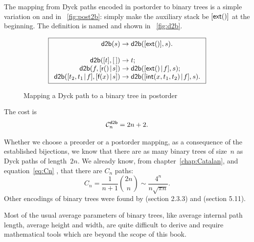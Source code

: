 The mapping from Dyck paths encoded in postorder to
binary trees is a simple variation on
 and
 in \fig~\vref{fig:post2b}:
simply make the auxiliary stack be \([\textsf{ext}()]\) at the
beginning. The definition is named 
and shown in \fig~\vref{fig:d2b}.
\begin{figure}
\begin{equation*}
\boxed{
\begin{array}{r@{\;}c@{\;}l}
\fun{d2b}(s) & \rightarrow & \fun{d2b}([\fun{ext}()],s).\\
\\
\fun{d2b}([t],\el) & \rightarrow & t;\\
\fun{d2b}(f,\cons{\fun{r}()}{s}) & \rightarrow & \fun{d2b}(\cons{\fun{ext}()}{f},s);\\
\fun{d2b}(\cons{t_2,t_1}{f},\cons{\fun{f}(x)}{s}) & \rightarrow & \fun{d2b}(\cons{\fun{int}(x,t_1,t_2)}{f},s).
\end{array}}
\end{equation*}
\caption{Mapping a Dyck path to a binary tree in postorder}
\label{fig:d2b}
\end{figure}
The cost is
\begin{equation*}
  \C{\fun{d2b}}{n} = 2n + 2.
  \index{d2b@$\C{\fun{d2b}}{n}$}
\end{equation*}

Whether we choose a preorder or a postorder mapping, as a consequence
of the established bijections, we know that there are as many binary
trees of size~\(n\) as Dyck paths of length~\(2n\). We already know,
from chapter~\ref{chap:Catalan}, and equation~\eqref{eq:Cn}
, that there are \(C_n\) paths:
\begin{equation*}
  C_n = \frac{1}{n+1}\binom{2n}{n} \sim \frac{4^n}{n\sqrt{\pi n}}.
\end{equation*}
Other encodings of binary trees were found by \cite{Knuth_1997}
(section 2.3.3) and \cite{SedgewickFlajolet_1996} (section 5.11).


Most of the usual average parameters of binary trees, like
average internal path length, average height and width, are quite
difficult to derive and require mathematical tools which are beyond
the scope of this book.

